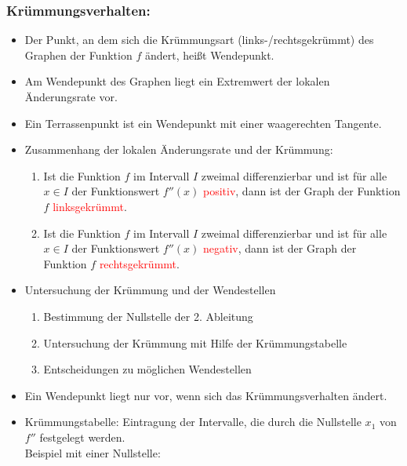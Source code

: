  \subsubsection{Krümmungsverhalten:}
 \begin{itemize}
     \item Der Punkt, an dem sich die Krümmungsart (links-/rechtsgekrümmt) des Graphen der Funktion $f$ ändert, heißt Wendepunkt. 
     \item Am Wendepunkt des Graphen liegt ein Extremwert der lokalen Änderungsrate vor. 
     \item Ein Terrassenpunkt ist ein Wendepunkt mit einer waagerechten Tangente.
     \item Zusammenhang der lokalen Änderungsrate und der Krümmung:\\
     \begin{enumerate}
         \item Ist die Funktion $f$ im Intervall $I$ zweimal differenzierbar und ist für alle $x\in I$ der Funktionswert $f''(x)$ \textcolor{red}{positiv}, dann ist der Graph der Funktion $f$ \textcolor{red}{linksgekrümmt}.\\
         \item Ist die Funktion $f$ im Intervall $I$ zweimal differenzierbar und ist für alle $x\in I$ der Funktionswert $f''(x)$ \textcolor{red}{negativ}, dann ist der Graph der Funktion $f$ \textcolor{red}{rechtsgekrümmt}.
     \end{enumerate}
      \item Untersuchung der Krümmung und der Wendestellen\\
 \begin{enumerate}
     \item Bestimmung der Nullstelle der 2. Ableitung\\
     \item Untersuchung der Krümmung mit Hilfe der Krümmungstabelle\\
     \item Entscheidungen zu möglichen Wendestellen
 \end{enumerate}
     \item Ein Wendepunkt liegt nur vor, wenn sich das Krümmungsverhalten ändert.
     \item Krümmungstabelle: Eintragung der Intervalle, die durch die Nullstelle $x_1$ von $f''$ festgelegt werden.\\
     \mynote Beispiel mit einer Nullstelle:\\
 \end{itemize}
